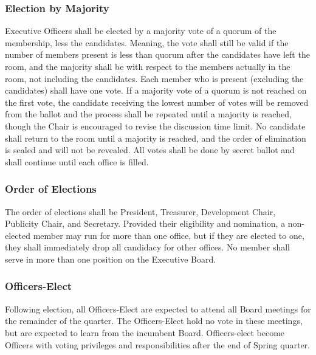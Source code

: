 \documentclass{article}
\begin{document}
\subsubsection{Election by Majority}

Executive Officers shall be elected by a majority vote of a quorum of the
membership, less the candidates. Meaning, the vote shall still be valid if the
number of members present is less than quorum after the candidates have left the
room, and the majority shall be with respect to the members actually in the
room, not including the candidates. Each member who is present (excluding the
candidates) shall have one vote. If a majority vote of a quorum is not reached
on the first vote, the candidate receiving the lowest number of votes will be
removed from the ballot and the process shall be repeated until a majority is
reached, though the Chair is encouraged to revise the discussion time limit. No
candidate shall return to the room until a majority is reached, and the order of
elimination is sealed and will not be revealed. All votes shall be done by
secret ballot and shall continue until each office is filled.

\subsubsection{Order of Elections}

The order of elections shall be President, Treasurer, Development
Chair, Publicity Chair, and Secretary. Provided their eligibility and nomination,
a non-elected member may run for more than one office, but if they are
elected to one, they shall immediately drop all candidacy for other
offices. No member shall serve in more than one position on the Executive
Board.
\subsubsection{Officers-Elect}
Following election, all Officers-Elect are expected to attend all Board meetings
for the remainder of the quarter. The Officers-Elect hold no vote in these
meetings, but are expected to learn from the incumbent Board. Officers-elect
become Officers with voting privileges and responsibilities after the end of
Spring quarter.

\end{document}

